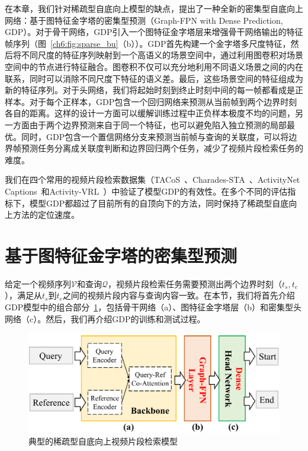 在本章，我们针对稀疏型自底向上模型的缺点，提出了一种全新的密集型自底向上网络：基于图特征金字塔的密集型预测（Graph-FPN with Dense Prediction, GDP）。对于骨干网络，GDP引入一个图特征金字塔层来增强骨干网络输出的特征帧序列（图~\ref{ch6:fig:sparse_bu}（b））。GDP首先构建一个金字塔多尺度特征，然后将不同尺度的特征序列映射到一个高语义的场景空间中，通过利用图卷积对场景空间中的节点进行特征融合。图卷积不仅可以充分地利用不同语义场景之间的内在联系，同时可以消除不同尺度下特征的语义差。最后，这些场景空间的特征组成为新的特征序列。对于头网络，我们将起始时刻到终止时刻中间的每一帧都看成是正样本。对于每个正样本，GDP包含一个回归网络来预测从当前帧到两个边界时刻各自的距离。这样的设计一方面可以缓解训练过程中正负样本极度不均的问题，另一方面由于两个边界预测来自于同一个特征，也可以避免陷入独立预测的局部最优。同时，GDP包含一个置信网络分支来预测当前帧与查询的关联度，可以将边界帧预测任务分离成关联度判断和边界回归两个任务，减少了视频片段检索任务的难度。

我们在四个常用的视频片段检索数据集（TACoS~\cite{regneri2013grounding}、Charades-STA~\cite{gao2017tall}、ActivityNet Captions~\cite{krishna2017dense}和Activity-VRL~\cite{feng2018video}）中验证了模型GDP的有效性。在多个不同的评估指标下，模型GDP都超过了目前所有的自顶向下的方法，同时保持了稀疏型自底向上方法的定位速度。

\section{基于图特征金字塔的密集型预测}

给定一个视频序列$\mathcal{V}$和查询$\mathcal{Q}$，视频片段检索任务需要预测出两个边界时刻（$t_s, t_e$），满足从$t_s$到$t_e$之间的视频片段内容与查询内容一致。在本节，我们将首先介绍GDP模型中的组合部分~\ref{ch6:fig:dense_bu}，包括骨干网络（a）、图特征金字塔层（b）和密集型头网络（c）。然后，我们再介绍GDP的训练和测试过程。

\begin{figure}[t]
    \centering
    \includegraphics[width=0.8\linewidth]{chapter6/res/dense_bu.pdf}
    \caption{典型的稀疏型自底向上视频片段检索模型}
    \label{ch6:fig:dense_bu}
\end{figure}

